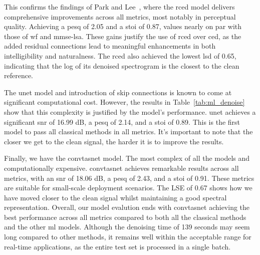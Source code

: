 This confirms the findings of Park and Lee~\cite{park2017acoustic}, where the \gls{rced} model delivers comprehensive improvements across all metrics, most notably in perceptual quality. Achieving a \gls{pesq} of 2.05 and a \gls{stoi} of 0.87, values nearly on par with those of \gls{wf} and \gls{mmse-lsa}. These gains justify the use of \gls{rced} over \gls{ced}, as the added residual connections lead to meaningful enhancements in both intelligibility and naturalness. The \gls{rced} also achieved the lowest \gls{lsd} of 0.65, indicating that the log of its denoised spectrogram is the closest to the clean reference.

The \gls{unet} model and introduction of skip connections is known to come at significant computational cost. However, the results in Table~\ref{tab:ml_denoise} show that this complexity is justified by the model's performance. \gls{unet} achieves a significant \gls{snr} of 16.99 dB, a \gls{pesq} of 2.14, and a \gls{stoi} of 0.89. This is the first model to pass all classical methods in all metrics. It’s important to note that the closer we get to the clean signal, the harder it is to improve the results.

Finally, we have the \gls{convtasnet} model. The most complex of all the models and computationally expensive. \gls{convtasnet} achieves remarkable results across all metrics, with an \gls{snr} of 18.06 dB, a \gls{pesq} of 2.43, and a \gls{stoi} of 0.91. These metrics are suitable for small-scale deployment scenarios. The LSE of 0.67 shows how we have moved closer to the clean signal whilst maintaining a good spectral representation. Overall, our model evalution ends with \gls{convtasnet} achieving the best performance across all metrics compared to both all the classical methods and the other \gls{ml} models. Although the denoising time of 139 seconds may seem long compared to other methods, it remains well within the acceptable range for real-time applications, as the entire test set is processed in a single batch.

